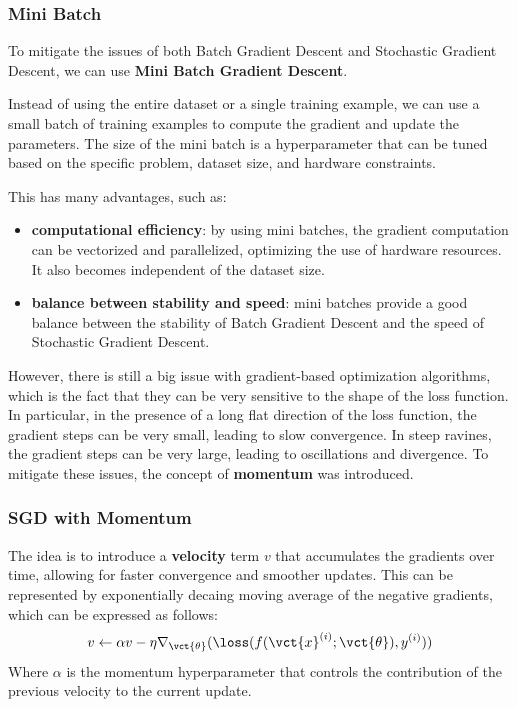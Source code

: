 \subsubsection*{Mini Batch}
To mitigate the issues of both Batch Gradient Descent and Stochastic Gradient Descent, we can use \textbf{Mini Batch Gradient Descent}. 

Instead of using the entire dataset or a single training example, we can use a small batch of training examples to compute the gradient and update the parameters.
The size of the mini batch is a hyperparameter that can be tuned based on the specific problem, dataset size, and hardware constraints.

This has many advantages, such as:
\begin{itemize}
    \item \textbf{computational efficiency}: by using mini batches, the gradient computation can be vectorized and parallelized,
    optimizing the use of hardware resources. It also becomes independent of the dataset size.
    \item \textbf{balance between stability and speed}: mini batches provide a good balance between the stability of Batch Gradient Descent and the speed of Stochastic Gradient Descent.
\end{itemize}

However, there is still a big issue with gradient-based optimization algorithms, which is the fact that they can be very sensitive to the shape of the loss function.
In particular, in the presence of a long flat direction of the loss function, the gradient steps can be very small, leading to slow convergence.
In steep ravines, the gradient steps can be very large, leading to oscillations and divergence.
To mitigate these issues, the concept of \textbf{momentum} was introduced.

\subsubsection*{SGD with Momentum}
The idea is to introduce a \textbf{velocity} term $v$ that accumulates the gradients over time, allowing for faster convergence and smoother updates.
This can be represented by exponentially decaing moving average of the negative gradients, which can be expressed as follows:
\begin{equation*}
    v \leftarrow \alpha v - \eta \nabla_{\vct{\theta}} (\loss(f(\vct{x}^{(i)}; \vct{\theta}), y^{(i)}))
\end{equation*}
Where $\alpha$ is the momentum hyperparameter that controls the contribution of the previous velocity to the current update.

